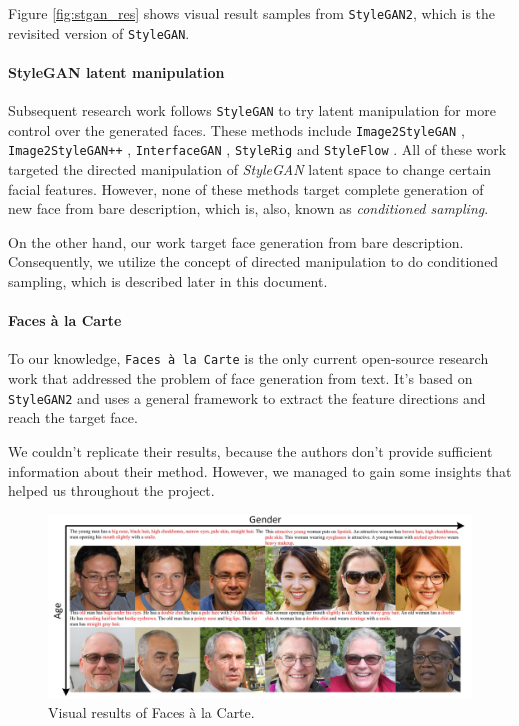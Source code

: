 Figure \ref{fig:stgan_res} shows visual result samples from \texttt{StyleGAN2}, which is the revisited version of \texttt{StyleGAN}.

\paragraph{StyleGAN latent manipulation}
Subsequent research work follows \texttt{StyleGAN} to try latent manipulation for more control over the generated faces. These methods include \texttt{Image2StyleGAN} \cite{abdal2019image2stylegan}, \texttt{Image2StyleGAN++} \cite{abdal2020image2stylegan}, \texttt{InterfaceGAN} \cite{shen2020interfacegan}, \texttt{StyleRig} \cite{tewari2020stylerig} and \texttt{StyleFlow} \cite{abdal2020styleflow}. All of these work targeted the directed manipulation of \emph{StyleGAN} latent space to change certain facial features. However, none of these methods target complete generation of new face from bare description, which is, also, known as \emph{conditioned sampling}. 

On the other hand, our work target face generation from bare description. Consequently, we utilize the concept of directed manipulation to do conditioned sampling, which is described later in this document.

\paragraph{Faces à la Carte}
To our knowledge, \texttt{Faces à la Carte} \cite{wang2020faces} is the only current open-source research work that addressed the problem of face generation from text. It's based on \texttt{StyleGAN2} and uses a general framework to extract the feature directions and reach the target face.

We couldn't replicate their results, because the authors don't provide sufficient information about their method. However, we managed to gain some insights that helped us throughout the project.

\begin{figure}[H]
    \centering
    \includegraphics[width=\textwidth]{images/face-carte.png}
    \caption{Visual results of Faces à la Carte.}
    \label{fig:face_carte}
\end{figure}


